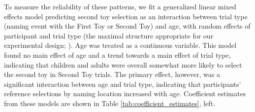 \documentclass[man]{apa2}
\begin{document}
To measure the reliability of these patterns, we fit a generalized linear mixed effects model predicting second toy selection as an interaction between trial type (naming event with the First Toy or Second Toy) and age, with random effects of participant and trial type (the maximal structure appropriate for our experimental design; ). Age was treated as a continuous variable. This model found no main effect of age and a trend towards a main effect of trial type, indicating that children and adults were overall somewhat more likely to select the second toy in Second Toy trials. The primary effect, however, was a significant interaction between age and trial type, indicating that participants' reference selections by naming location increased with age. Coefficient estimates from these models are shown in Table \ref{tab:coefficient_estimates}, left.

\end{document}
